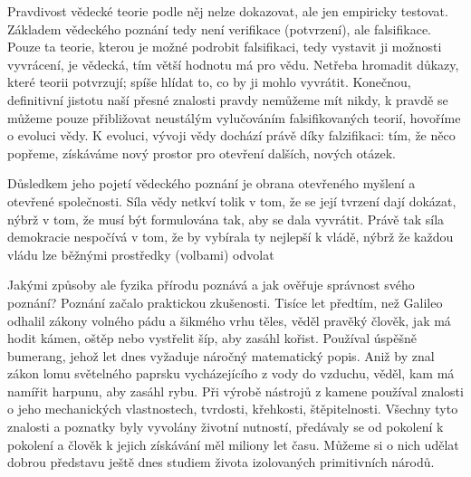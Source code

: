 \begin{tcnote}
        \tcblower
        Pravdivost vědecké teorie podle něj nelze dokazovat, ale jen empiricky testovat. Základem
        vědeckého poznání tedy není verifikace (potvrzení), ale falsifikace. Pouze ta teorie, kterou
        je možné podrobit falsifikaci, tedy vystavit ji možnosti vyvrácení, je vědecká, tím větší
        hodnotu má pro vědu. Netřeba hromadit důkazy, které teorii potvrzují; spíše hlídat to, co by
        ji mohlo vyvrátit. Konečnou, definitivní jistotu naší přesné znalosti pravdy nemůžeme mít
        nikdy, k pravdě se můžeme pouze přibližovat neustálým vylučováním falsifikovaných teorií,
        hovoříme o evoluci vědy. K evoluci, vývoji vědy dochází právě díky falzifikaci: tím, že něco
        popřeme, získáváme nový prostor pro otevření dalších, nových otázek.

        Důsledkem jeho pojetí vědeckého poznání je obrana otevřeného myšlení a otevřené společnosti.
        Síla vědy netkví tolik v tom, že se její tvrzení dají dokázat, nýbrž v tom, že musí být
        formulována tak, aby se dala vyvrátit. Právě tak síla demokracie nespočívá v tom, že by
        vybírala ty nejlepší k vládě, nýbrž že každou vládu lze běžnými prostředky (volbami) odvolat
      \end{tcnote}

      Jakými způsoby ale fyzika přírodu poznává a jak ověřuje správnost svého poznání? Poznání
      začalo praktickou zkušenosti. Tisíce let předtím, než Galileo odhalil zákony volného pádu a
      šikmého vrhu těles, věděl pravěký člověk, jak má hodit kámen, oštěp nebo vystřelit šíp, aby
      zasáhl kořist. Používal úspěšně bumerang, jehož let dnes vyžaduje náročný matematický popis.
      Aniž by znal zákon lomu světelného paprsku vycházejícího z vody do vzduchu, věděl, kam má
      namířit harpunu, aby zasáhl rybu. Při výrobě nástrojů z kamene používal znalosti o jeho
      mechanických vlastnostech, tvrdosti, křehkosti, štěpitelnosti. Všechny tyto znalosti a
      poznatky byly vyvolány životní nutností, předávaly se od pokolení k pokolení a člověk k jejich
      získávání měl miliony let času. Můžeme si o nich udělat dobrou představu ještě dnes studiem
      života izolovaných primitivních národů.



